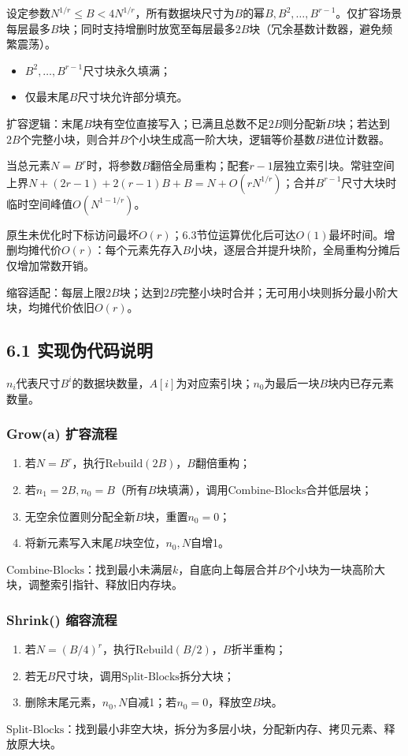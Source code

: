 \documentclass[11pt,a4paper]{article}
\begin{document}
设定参数$N^{1/r}\le B<4N^{1/r}$，所有数据块尺寸为$B$的幂$B,B^2,\dots,B^{r-1}$。仅扩容场景每层最多$B$块；同时支持增删时放宽至每层最多$2B$块（冗余基数计数器，避免频繁震荡）。
\begin{itemize}
    \item $B^2,\dots,B^{r-1}$尺寸块永久填满；
    \item 仅最末尾$B$尺寸块允许部分填充。
\end{itemize}

扩容逻辑：末尾$B$块有空位直接写入；已满且总数不足$2B$则分配新$B$块；若达到$2B$个完整小块，则合并$B$个小块生成高一阶大块，逻辑等价基数$B$进位计数器。

当总元素$N=B^r$时，将参数$B$翻倍全局重构；配套$r-1$层独立索引块。常驻空间上界$N+(2r-1)+2(r-1)B+B=N+O(rN^{1/r})$；合并$B^{r-1}$尺寸大块时临时空间峰值$O(N^{1-1/r})$。

原生未优化时下标访问最坏$O(r)$；6.3节位运算优化后可达$O(1)$最坏时间。增删均摊代价$O(r)$：每个元素先存入$B$小块，逐层合并提升块阶，全局重构分摊后仅增加常数开销。

缩容适配：每层上限$2B$块；达到$2B$完整小块时合并；无可用小块则拆分最小阶大块，均摊代价依旧$O(r)$。

\subsection{6.1 实现伪代码说明}
$n_i$代表尺寸$B^i$的数据块数量，$A[i]$为对应索引块；$n_0$为最后一块$B$块内已存元素数量。
\subsubsection{Grow(a) 扩容流程}
\begin{enumerate}
    \item 若$N=B^r$，执行$\text{Rebuild}(2B)$，$B$翻倍重构；
    \item 若$n_1=2B,n_0=B$（所有$B$块填满），调用$\text{Combine-Blocks}$合并低层块；
    \item 无空余位置则分配全新$B$块，重置$n_0=0$；
    \item 将新元素写入末尾$B$块空位，$n_0,N$自增1。
\end{enumerate}
$\text{Combine-Blocks}$：找到最小未满层$k$，自底向上每层合并$B$个小块为一块高阶大块，调整索引指针、释放旧内存块。

\subsubsection{Shrink() 缩容流程}
\begin{enumerate}
    \item 若$N=(B/4)^r$，执行$\text{Rebuild}(B/2)$，$B$折半重构；
    \item 若无$B$尺寸块，调用$\text{Split-Blocks}$拆分大块；
    \item 删除末尾元素，$n_0,N$自减1；若$n_0=0$，释放空$B$块。
\end{enumerate}
$\text{Split-Blocks}$：找到最小非空大块，拆分为多层小块，分配新内存、拷贝元素、释放原大块。
\end{document}
